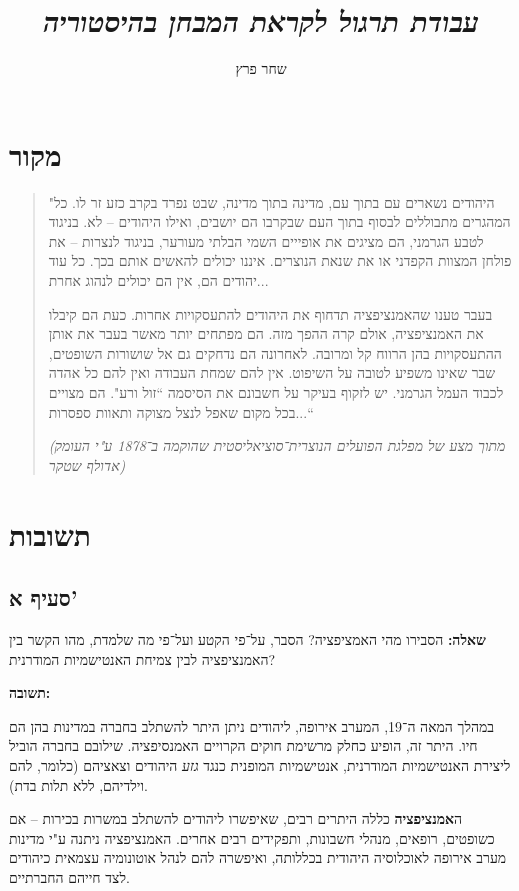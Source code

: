 \documentclass[]{article}
\author{שחר פרץ}
\title{\textit{עבודת תרגול לקראת המבחן בהיסטוריה}}
\begin{document}
	\maketitle
	\section*{מקור}
	
	\begin{quote}
		"היהודים נשארים עם בתוך עם, מדינה בתוך מדינה, שבט נפרד בקרב כזע זר לו. כל המהגרים מתבוללים לבסוף בתוך העם שבקרבו הם יושבים, ואילו היהודים – לא. בניגוד לטבע הגרמני, הם מציגים את אופייים השמי הבלתי מעורער, בניגוד לנצרות – את פולחן המצוות הקפדני או את שנאת הנוצרים. איננו יכולים להאשים אותם בכך. כל עוד יהודים הם, אין הם יכולים לנהוג אחרת...
		
		בעבר טענו שהאמנציפציה תדחוף את היהודים להתעסקויות אחרות. כעת הם קיבלו את האמנציפציה, אולם קרה ההפך מזה. הם מפתחים יותר מאשר בעבר את אותן ההתעסקויות בהן הרווח קל ומרובה. לאחרונה הם נדחקים גם אל שושורות השופטים, שבר שאינו משפיע לטובה על השיפוט. אין להם שמחת העבודה ואין להם כל אהדה לכבוד העמל הגרמני. יש לזקוף בעיקר על חשבונם את הסיסמה ``זול ורע". הם מצויים בכל מקום שאפל לנצל מצוקה ותאוות ספסרות...``
		
		\textit{(מתוך מצע של מפלגת הפועלים הנוצרית־סוציאליסטית שהוקמה ב־1878 ע"י העומק אדולף שטקר)}
	\end{quote}
	
	\section*{תשובות}
	\subsection*{סעיף א'}
		\textbf{שאלה: }הסבירו מהי האמציפציה? הסבר, על־פי הקטע ועל־פי מה שלמדת, מהו הקשר בין האמנציפציה לבין צמיחת האנטישמיות המודרנית? 
		
		\textbf{תשובה: }
		
		במהלך המאה ה־19, המערב אירופה, ליהודים ניתן היתר להשתלב בחברה במדינות בהן הם חיו. היתר זה, הופיע כחלק מרשימת חוקים הקרויים האמנסיפציה. שילובם בחברה הוביל ליצירת האנטישמיות המודרנית, אנטישמיות המופנית כנגד \textit{גזע} היהודים וצאציהם (כלומר, להם וילדיהם, ללא תלות בדת). 
		
		ה\textbf{אמנציפציה} כללה היתרים רבים, שאיפשרו ליהודים להשתלב במשרות בכירות – אם כשופטים, רופאים, מנהלי חשבונות, ותפקידים רבים אחרים. האמנציפציה ניתנה ע"י מדינות מערב אירופה לאוכלוסיה היהודית בכללותה, ואיפשרה להם לנהל אוטונומיה עצמאית כיהודים לצד חייהם החברתיים. 
		
\end{document}
